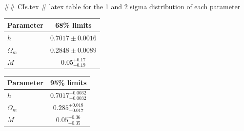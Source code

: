 ## CIs.tex
# latex table for the 1 and 2 sigma distribution of each parameter

\begin{tabular} { l  c}
 Parameter &  68\% limits\\
\hline
{\boldmath$h              $} & $0.7017\pm 0.0016          $\\
{\boldmath$\Omega_m       $} & $0.2848\pm 0.0089          $\\
{\boldmath$M              $} & $0.05^{+0.17}_{-0.19}      $\\
\hline
\end{tabular}

\begin{tabular} { l  c}
 Parameter &  95\% limits\\
\hline
{\boldmath$h              $} & $0.7017^{+0.0032}_{-0.0032}$\\
{\boldmath$\Omega_m       $} & $0.285^{+0.018}_{-0.017}   $\\
{\boldmath$M              $} & $0.05^{+0.36}_{-0.35}      $\\
\hline
\end{tabular}

